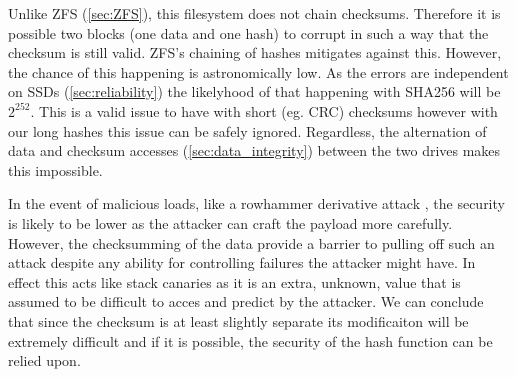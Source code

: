         Unlike ZFS (\autoref{sec:ZFS}), this filesystem does not chain checksums.
        Therefore it is possible two blocks (one data and one hash) to corrupt
        in such a way that the checksum is still valid. ZFS's chaining of
        hashes mitigates against this. However, the chance of this happening is
        astronomically low. As the errors are independent on SSDs
        (\autoref{sec:reliability}) the likelyhood of that happening with SHA256
        will be $2^{252}$. This is a valid issue to have with short (eg. CRC)
        checksums however with our long hashes this issue can be safely
        ignored. Regardless, the alternation of data and checksum accesses
        (\autoref{sec:data_integrity}) between the two drives makes this
        impossible.

        In the event of malicious loads, like a rowhammer derivative attack
        \cite{ssd_rowhammer}, the security is likely to be lower as the
        attacker can craft the payload more carefully. However, the
        checksumming of the data provide a barrier to pulling off such an
        attack despite any ability for controlling failures the attacker might
        have. In effect this acts like stack canaries \cite{canary} as it is
        an extra, unknown, value that is assumed to be difficult to acces and
        predict by the attacker. We can conclude that since the checksum is at
        least slightly separate its modificaiton will be extremely difficult
        and if it is possible, the security of the hash function can be relied
        upon.

